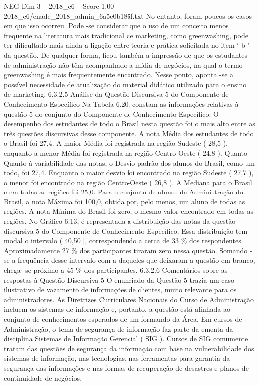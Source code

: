 \begin{textsample}{NEG Dim 3 – 2018\_c6 – Score 1.00 – 2018\_c6/enade\_2018\_admin\_6a5e0b186f.txt}
No entanto, foram poucos os casos em que isso ocorreu.
Pode -se considerar que o uso de um conceito menos frequente na literatura mais tradicional de marketing, como greenwashing, pode ter dificultado mais ainda a ligação entre teoria e prática solicitada no item ‘ b ’ da questão.
De qualquer forma, ficou também a impressão de que os estudantes de administração não têm acompanhado a mídia de negócios, na qual o termo greenwashing é mais frequentemente encontrado.
Nesse ponto, aponta -se a possível necessidade de atualização do material didático utilizado para o ensino de marketing. 6.3.2.5 Análise da Questão Discursiva 5 do Componente de Conhecimento Específico Na Tabela 6.20, constam as informações relativas à questão 5 do conjunto do Componente de Conhecimento Específico.
O desempenho dos estudantes de todo o Brasil nesta questão foi o mais alto entre as três questões discursivas desse componente.
A nota Média dos estudantes de todo o Brasil foi 27,4.
A maior Média foi registrada na região Sudeste ( 28,5 ), enquanto a menor Média foi registrada na região Centro-Oeste ( 24,8 ).
Quanto Quanto à variabilidade das notas, o Desvio padrão dos alunos do Brasil, como um todo, foi 27,4.
Enquanto o maior desvio foi encontrado na região Sudeste ( 27,7 ), o menor foi encontrado na região Centro-Oeste ( 26,8 ).
A Mediana para o Brasil e em todas as regiões foi 25,0.
Para o conjunto de alunos de Administração do Brasil, a nota Máxima foi 100,0, obtida por, pelo menos, um aluno de todas as regiões.
A nota Mínima do Brasil foi zero, o mesmo valor encontrado em todas as regiões.
No Gráfico 6.13, é representada a distribuição das notas da questão discursiva 5 do Componente de Conhecimento Específico.
Essa distribuição tem modal o intervalo ( 40,50 ], correspondendo a cerca de 33 \% dos respondentes.
Aproximadamente 27 \% dos participantes tiraram zero nessa questão.
Somando -se a frequência desse intervalo com a daqueles que deixaram a questão em branco, chega -se próximo a 45 \% dos participantes. 6.3.2.6 Comentários sobre as respostas à Questão Discursiva 5 O enunciado da Questão 5 trazia um caso ilustrativo de vazamento de informações de clientes, muito relevante para os administradores.
As Diretrizes Curriculares Nacionais do Curso de Administração incluem os sistemas de informação e, portanto, a questão está alinhada ao conjunto de conhecimentos esperados de um formando da Área.
Em cursos de Administração, o tema de segurança de informação faz parte da ementa da disciplina Sistemas de Informação Gerencial ( SIG ).
Cursos de SIG comumente tratam das questões de segurança da informação com base na vulnerabilidade dos sistemas de informação, nas tecnologias, nas ferramentas para garantia da segurança das informações e nas formas de recuperação de desastres e planos de continuidade de negócios.

\end{textsample}
